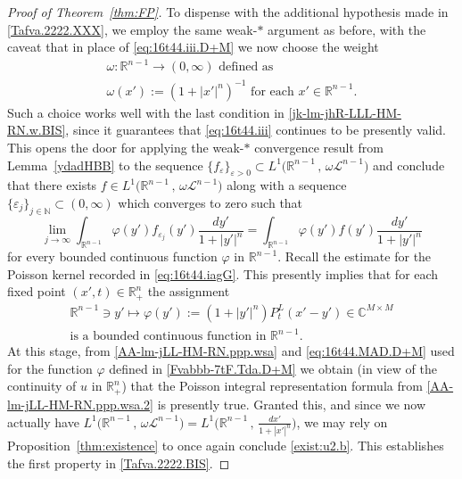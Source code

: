 \documentclass[11pt,reqno]{amsart}
\numberwithin{equation}{section}
\theoremstyle{remark}
\begin{document}
\begin{proof}[Proof of Theorem~\ref{thm:FP}]
To dispense with the additional hypothesis made in \eqref{Tafva.2222.XXX}, we employ the same weak-$\ast$ argument as before, 
with the caveat that in place of \eqref{eq:16t44.iii.D+M} we now choose the weight 
%
\begin{equation}\label{eq:16t44.iii.D+M.222}
\begin{array}{c}
\text{$\omega:{\mathbb{R}}^{n-1}\to(0,\infty)$ defined as} 
\\[4pt]
\text{$\omega(x'):=(1+|x'|^{n})^{-1}$ for each $x'\in{\mathbb{R}}^{n-1}$}.
\end{array}
\end{equation}
%
Such a choice works well with the last condition in \eqref{jk-lm-jhR-LLL-HM-RN.w.BIS}, since it guarantees that   
\eqref{eq:16t44.iii} continues to be presently valid. This opens the door for applying the weak-$\ast$ convergence result 
from Lemma~\ref{ydadHBB} to the sequence $\big\{f_\varepsilon\big\}_{\varepsilon>0}\subset 
L^1\big({\mathbb{R}}^{n-1}\,,\,\omega{\mathscr{L}}^{n-1}\big)$ and conclude that there exists 
$f\in L^1\big({\mathbb{R}}^{n-1}\,,\,\omega{\mathscr{L}}^{n-1}\big)$ 
along with a sequence $\{\varepsilon_j\}_{j\in{\mathbb{N}}}\subset(0,\infty)$ which converges to zero such that 
%
\begin{equation}\label{eq:16t44.MAD.D+M}
\lim_{j\to\infty}\int_{{\mathbb{R}}^{n-1}}\varphi(y')f_{\varepsilon_j}(y')\frac{dy'}{1+|y'|^{n}}
=\int_{{\mathbb{R}}^{n-1}}\varphi(y')f(y')\frac{dy'}{1+|y'|^{n}}
\end{equation}
%
for every bounded continuous function $\varphi$ in ${\mathbb{R}}^{n-1}$. Recall the estimate for the 
Poisson kernel recorded in \eqref{eq:16t44.iagG}. This presently implies that  
for each fixed point $(x',t)\in{\mathbb{R}}^n_{+}$ the assignment 
%
\begin{equation}\label{Fvabbb-7tF.Tda.D+M}
\begin{array}{c}
\displaystyle
{\mathbb{R}}^{n-1}\ni y'\mapsto\varphi(y'):=(1+|y'|^{n})P^L_t(x'-y')\in{\mathbb{C}}^{M\times M}
\\[6pt]
\text{is a bounded continuous function in ${\mathbb{R}}^{n-1}$}.
\end{array}
\end{equation}
%
At this stage, from \eqref{AA-lm-jLL-HM-RN.ppp.wsa} and \eqref{eq:16t44.MAD.D+M} 
used for the function $\varphi$ defined in \eqref{Fvabbb-7tF.Tda.D+M} we obtain 
(in view of the continuity of $u$ in ${\mathbb{R}}^n_{+}$) that the Poisson integral representation 
formula from \eqref{AA-lm-jLL-HM-RN.ppp.wsa.2} is presently true. 
Granted this, and since we now actually have $L^1\big({\mathbb{R}}^{n-1}\,,\,\omega{\mathscr{L}}^{n-1}\big)
=L^1\Big({\mathbb{R}}^{n-1}\,,\,\displaystyle\frac{dx'}{1+|x'|^{n}}\Big)$, we may rely on  
Proposition~\ref{thm:existence} to once again conclude \eqref{exist:u2.b}.
This establishes the first property in \eqref{Tafva.2222.BIS}. 


\end{proof}
\end{document}

